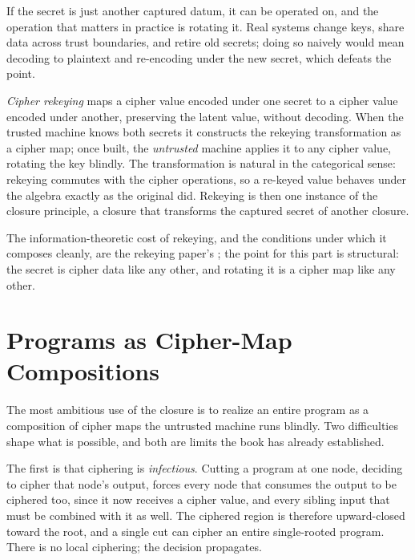 If the secret is just another captured datum, it can be operated on, and the
operation that matters in practice is rotating it. Real systems change keys,
share data across trust boundaries, and retire old secrets; doing so naively
would mean decoding to plaintext and re-encoding under the new secret, which
defeats the point.

\begin{remark}
\label{rem:rekeying-functor}
\emph{Cipher rekeying} maps a cipher value encoded under one secret to a
cipher value encoded under another, preserving the latent value, without
decoding. When the trusted machine knows both secrets it constructs the
rekeying transformation as a cipher map; once built, the \emph{untrusted}
machine applies it to any cipher value, rotating the key blindly. The
transformation is natural in the categorical sense: rekeying commutes with
the cipher operations, so a re-keyed value behaves under the algebra exactly
as the original did. Rekeying is then one instance of the closure principle,
a closure that transforms the captured secret of another closure.
\end{remark}

The information-theoretic cost of rekeying, and the conditions under which it
composes cleanly, are the rekeying paper's \cite{towell2026rekeying}; the
point for this part is structural: the secret is cipher data like any other,
and rotating it is a cipher map like any other.

\section{Programs as Cipher-Map Compositions}
\label{sec:programs}

The most ambitious use of the closure is to realize an entire program as a
composition of cipher maps the untrusted machine runs blindly. Two
difficulties shape what is possible, and both are limits the book has
already established.

The first is that ciphering is \emph{infectious}. Cutting a program at one
node, deciding to cipher that node's output, forces every node that consumes
the output to be ciphered too, since it now receives a cipher value, and
every sibling input that must be combined with it as well. The ciphered
region is therefore upward-closed toward the root, and a single cut can
cipher an entire single-rooted program. There is no local ciphering; the
decision propagates.

